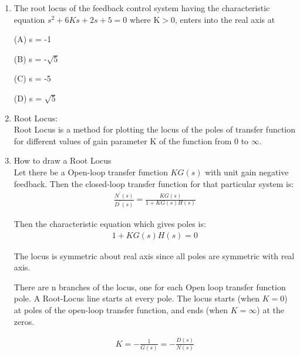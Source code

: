 \begin{enumerate}[label=\thesubsection.\arabic*.,ref=\thesubsection.\theenumi]
\item The root locus of the feedback control system having the characteristic equation $ s^2 + 6Ks + 2s + 5 = 0 $ where
K$>$0, enters into the real axis at

(A) s = -1

(B) s = -$\sqrt{5}$

(C) s = -5

(D) s = $\sqrt{5}$


\solution

\item Root Locus: \\
	  Root Locus is a method for plotting the locus of the poles of transfer function for different values of gain parameter K of the function from 0 to $\infty$.

\item How to draw a Root Locus	\\
     Let there be a Open-loop transfer function  $KG(s)$  with unit gain negative feedback. Then the closed-loop transfer function for that particular system is:
    \begin{align}
         \frac{N^{'}(s)}{D^{'}(s)}=\frac{K G(s)}{1+K G(s) H(s)}    
    \end{align}
    
     Then the characteristic equation which gives poles is: 
    \begin{align}
        1+KG(s)H(s)=0
    \end{align}
    
     The locus is symmetric about real axis since all poles are symmetric with real axis.
     
    There are n branches of the locus, one for each Open loop transfer function pole. A Root-Locus line starts at every pole. The locus starts (when $K = 0$) at poles of the open-loop transfer function, and ends (when $K = \infty$) at the zeros.
    
    
    \begin{align}
        K=-\frac{1}{G(s)}=-\frac{D(s)}{N(s)}    
    \end{align}


\end{enumerate}
